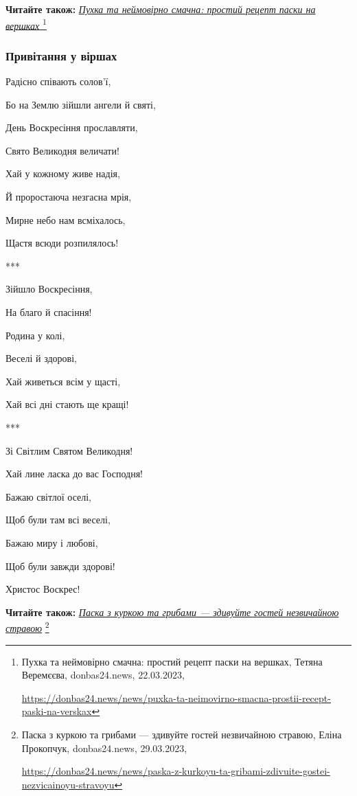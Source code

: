 \textbf{Читайте також:} \href{https://donbas24.news/news/puxka-ta-neimovirno-smacna-prostii-recept-paski-na-verskax}{\emph{Пухка та неймовірно смачна: простий рецепт паски на вершках }}%
\footnote{Пухка та неймовірно смачна: простий рецепт паски на вершках, Тетяна Веремєєва, donbas24.news, 22.03.2023, \par%
\url{https://donbas24.news/news/puxka-ta-neimovirno-smacna-prostii-recept-paski-na-verskax}%
}

\subsubsection{Привітання у віршах}

Радісно співають солов'ї,

Бо на Землю зійшли ангели й святі,

День Воскресіння прославляти,

Свято Великодня величати!

Хай у кожному живе надія,

Й проростаюча незгасна мрія,

Мирне небо нам всміхалось,

Щастя всюди розпилялось!

***

Зійшло Воскресіння,

На благо й спасіння!

Родина у колі,

Веселі й здорові,

Хай живеться всім у щасті,

Хай всі дні стають ще кращі!

***

Зі Світлим Святом Великодня!

Хай лине ласка до вас Господня!

Бажаю світлої оселі,

Щоб були там всі веселі,

Бажаю миру і любові,

Щоб були завжди здорові!

Христос Воскрес!

\textbf{Читайте також:} \href{https://donbas24.news/news/paska-z-kurkoyu-ta-gribami-zdivuite-gostei-nezvicainoyu-stravoyu}{\emph{Паска з куркою та грибами — здивуйте гостей незвичайною стравою}}%
\footnote{Паска з куркою та грибами — здивуйте гостей незвичайною стравою, Еліна Прокопчук, donbas24.news, 29.03.2023, \par%
\url{https://donbas24.news/news/paska-z-kurkoyu-ta-gribami-zdivuite-gostei-nezvicainoyu-stravoyu}%
}

